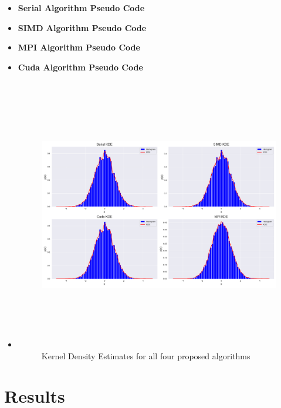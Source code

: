\documentclass[review]{elsarticle}
\begin{document}
\begin{itemize}
    \item \textbf{Serial Algorithm Pseudo Code}
    \item \textbf{SIMD Algorithm Pseudo Code}
    \item \textbf{MPI Algorithm Pseudo Code}
    \item \textbf{Cuda Algorithm Pseudo Code} \newline
    \item 
    \begin{figure}
      \centering
      \includegraphics[width=15cm,height=12cm]{figures/multiple_kde_temp.png}
      \caption{Kernel Density Estimates for all four proposed algorithms}
      \label{fig:multiple_kde}
    \end{figure}
\end{itemize}


\section{Results}
\end{document}
